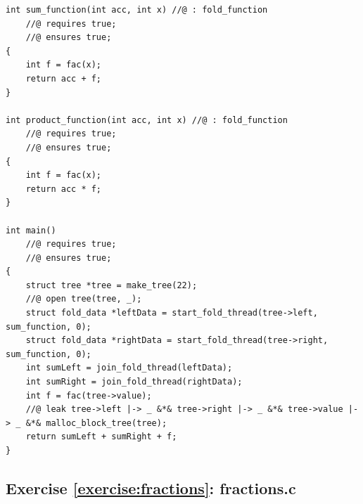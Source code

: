 \documentclass{article}
\begin{document}
\begin{lstlisting}
int sum_function(int acc, int x) //@ : fold_function
    //@ requires true;
    //@ ensures true;
{
    int f = fac(x);
    return acc + f;
}

int product_function(int acc, int x) //@ : fold_function
    //@ requires true;
    //@ ensures true;
{
    int f = fac(x);
    return acc * f;
}

int main()
    //@ requires true;
    //@ ensures true;
{
    struct tree *tree = make_tree(22);
    //@ open tree(tree, _);
    struct fold_data *leftData = start_fold_thread(tree->left, sum_function, 0);
    struct fold_data *rightData = start_fold_thread(tree->right, sum_function, 0);
    int sumLeft = join_fold_thread(leftData);
    int sumRight = join_fold_thread(rightData);
    int f = fac(tree->value);
    //@ leak tree->left |-> _ &*& tree->right |-> _ &*& tree->value |-> _ &*& malloc_block_tree(tree);
    return sumLeft + sumRight + f;
}
\end{lstlisting}

\subsection{Exercise \ref{exercise:fractions}:
fractions.c}\label{solution:fractions}
\end{document}
